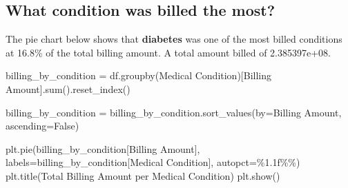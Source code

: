 \documentclass[
  letterpaper,
  DIV=11,
  numbers=noendperiod]{scrartcl}
\newenvironment{Shaded}{\begin{snugshade}}{\end{snugshade}}
\newcommand{\BuiltInTok}[1]{\textcolor[rgb]{0.00,0.23,0.31}{#1}}
\newcommand{\NormalTok}[1]{\textcolor[rgb]{0.00,0.23,0.31}{#1}}
\newcommand{\OperatorTok}[1]{\textcolor[rgb]{0.37,0.37,0.37}{#1}}
\newcommand{\SpecialCharTok}[1]{\textcolor[rgb]{0.37,0.37,0.37}{#1}}
\newcommand{\StringTok}[1]{\textcolor[rgb]{0.13,0.47,0.30}{#1}}
\newcommand{\VariableTok}[1]{\textcolor[rgb]{0.07,0.07,0.07}{#1}}
\begin{document}
\subsection{What condition was billed the
most?}\label{what-condition-was-billed-the-most}

The pie chart below shows that \textbf{diabetes} was one of the most
billed conditions at 16.8\% of the total billing amount. A total amount
billed of 2.385397e+08.

\begin{Shaded}
\begin{Highlighting}[]
\NormalTok{billing\_by\_condition }\OperatorTok{=}\NormalTok{ df.groupby(}\StringTok{\textquotesingle{}Medical Condition\textquotesingle{}}\NormalTok{)[}\StringTok{\textquotesingle{}Billing Amount\textquotesingle{}}\NormalTok{].}\BuiltInTok{sum}\NormalTok{().reset\_index()}

\NormalTok{billing\_by\_condition }\OperatorTok{=}\NormalTok{ billing\_by\_condition.sort\_values(by}\OperatorTok{=}\StringTok{\textquotesingle{}Billing Amount\textquotesingle{}}\NormalTok{, ascending}\OperatorTok{=}\VariableTok{False}\NormalTok{)}



\NormalTok{plt.pie(billing\_by\_condition[}\StringTok{\textquotesingle{}Billing Amount\textquotesingle{}}\NormalTok{], labels}\OperatorTok{=}\NormalTok{billing\_by\_condition[}\StringTok{\textquotesingle{}Medical Condition\textquotesingle{}}\NormalTok{], autopct}\OperatorTok{=}\StringTok{\textquotesingle{}}\SpecialCharTok{\%1.1f\%\%}\StringTok{\textquotesingle{}}\NormalTok{)}
\NormalTok{plt.title(}\StringTok{\textquotesingle{}Total Billing Amount per Medical Condition\textquotesingle{}}\NormalTok{)}
\NormalTok{plt.show()}
\end{Highlighting}
\end{Shaded}
\end{document}
